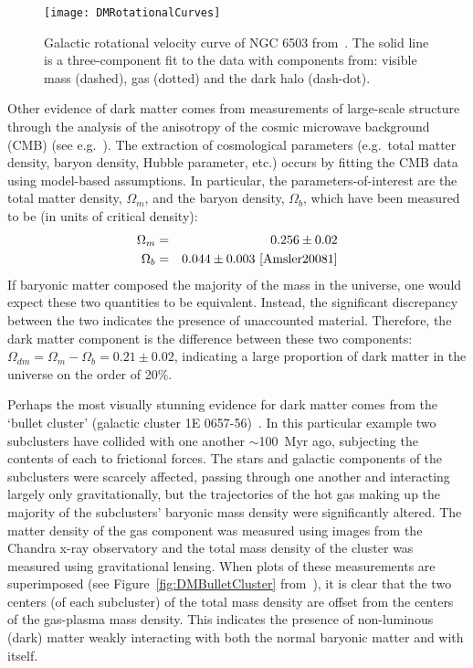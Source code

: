 		\begin{figure}
			\centering
			\texttt{[image: DMRotationalCurves]}
			\caption[Galactic rotational velocity curve of NGC 6503.]{Galactic rotational velocity curve of NGC 6503
			from~\cite{Begeman:1991iy}.  The solid line is a three-component fit to the data with components from:
			visible mass (dashed), gas (dotted) and the dark halo (dash-dot).  }
			\label{fig:DMRotCurve}
		\end{figure}
	Other evidence of dark matter comes from measurements of large-scale structure through the analysis of the anisotropy of the cosmic microwave background (CMB) (see e.g.~\cite{Amsler20081}).  The extraction of cosmological parameters (e.g.~total matter density, baryon density, Hubble parameter, etc.) occurs by fitting the CMB data using model-based assumptions.  In particular, the parameters-of-interest are the total matter density, $\Omega_{m}$, and the baryon density, $\Omega_{b}$, which have been measured to be (in units of critical density):
		\begin{eqnarray*}
			\Omega_{m} & = & 0.256 \pm 0.02 \\
			\Omega_{b} & = & 0.044 \pm 0.003~\cite{Amsler20081}
		\end{eqnarray*}
If baryonic matter composed the majority of the mass in the universe, one would expect these two quantities to be equivalent.  Instead, the significant discrepancy between the two indicates the presence of unaccounted material.  Therefore, the dark matter component is the difference between these two components: $\Omega_{dm} = \Omega_{m} - \Omega_{b} = 0.21 \pm 0.02$, indicating a large proportion of dark matter in the universe on the order of 20\%.

	
	Perhaps the most visually stunning evidence for dark matter comes from the `bullet cluster' (galactic cluster 1E 0657-56)~\cite{Clowe06}.  In this particular example two subclusters have collided with one another $\sim$100~Myr ago, subjecting the contents of each to frictional forces.  The stars and galactic components of the subclusters were scarcely affected, passing through one another and interacting largely only gravitationally, but the trajectories of the hot gas making up the majority of the subclusters' baryonic mass density were significantly altered.  The matter density of the gas component was measured using images from the Chandra x-ray observatory and the total mass density of the cluster was measured using gravitational lensing.  When plots of these measurements are superimposed (see Figure~\ref{fig:DMBulletCluster} from~\cite{Clowe06}), it is clear that the two centers (of each subcluster) of the total mass density are offset from the centers of the gas-plasma mass density.  This indicates the presence of non-luminous (dark) matter weakly interacting with both the normal baryonic matter and with itself.  
	
